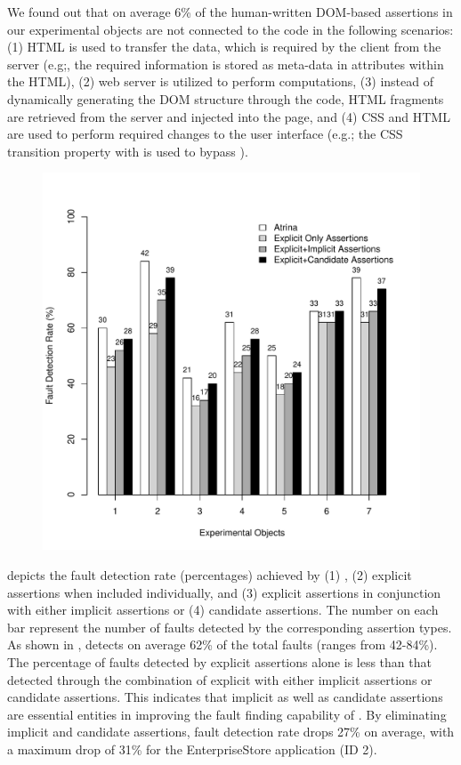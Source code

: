 We found out that on average 6\% of the human-written DOM-based assertions in our experimental objects are not connected to the \javascript code in the following scenarios: (1) HTML is used to transfer the data, which is required by the client from the server (e.g;, the required information is stored as meta-data in attributes within the HTML), (2) web server is utilized to perform computations, (3) instead of dynamically generating the DOM structure through the \javascript code, HTML fragments are retrieved from the server and injected into the page, and (4) CSS and HTML are used to perform required changes to the user interface (e.g.; the CSS transition property with  is used to bypass \javascript).

\begin{figure}[!t]
  \centering
  \includegraphics[width=0.8\hsize]{r-scripts/assertionTypeFaultDetec}
  \vspace{-0.18in} 
  \vspace{-0.3in} 
  \label{Fig:assertionTypeFaultDetec} 
\end{figure}

  depicts the fault detection rate (percentages) achieved by (1) \tool, (2) explicit assertions when included individually, and (3) explicit assertions in conjunction with either implicit assertions or (4) candidate assertions. The number on each bar represent the number of faults detected by the corresponding assertion types. As shown in , \tool detects on average 62\% of the total faults (ranges from 42-84\%).
The percentage of faults detected by explicit assertions alone is less than that detected through the combination of explicit with either implicit assertions or candidate assertions. This indicates that implicit as well as candidate assertions are essential entities in improving the fault finding capability of \tool. By eliminating implicit and candidate assertions, fault detection rate drops 27\% on average, with a maximum drop of 31\% for the EnterpriseStore application (ID 2).

